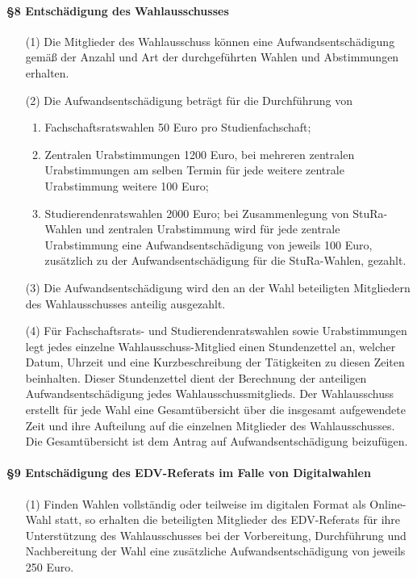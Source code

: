     \paragraph{§8 Entschädigung des Wahlausschusses}
        \begin{itemize}
            \item[(1)]  Die Mitglieder des Wahlausschuss können eine Aufwandsentschädigung gemäß der Anzahl und Art der durchgeführten Wahlen und Abstimmungen erhalten.
            \item[(2)] Die Aufwandsentschädigung beträgt für die Durchführung von
                \begin{enumerate}
                    \item   Fachschaftsratswahlen 50 Euro pro Studienfachschaft; 
                    \item   Zentralen Urabstimmungen 1200 Euro, bei mehreren zentralen Urabstimmungen am selben Termin für jede weitere zentrale Urabstimmung weitere 100 Euro; 
                    \item   Studierendenratswahlen 2000 Euro; bei Zusammenlegung von StuRa-Wahlen und zentralen Urabstimmung wird für jede zentrale Urabstimmung eine Aufwandsentschädigung von jeweils 100 Euro, zusätzlich zu der Aufwandsentschädigung für die StuRa-Wahlen, gezahlt.
                \end{enumerate}
            \item[(3)] Die Aufwandsentschädigung wird den an der Wahl beteiligten Mitgliedern des Wahlausschusses anteilig ausgezahlt. 
            \item[(4)] Für Fachschaftsrats- und Studierendenratswahlen sowie Urabstimmungen legt jedes einzelne Wahlausschuss-Mitglied einen Stundenzettel an, welcher Datum, Uhrzeit und eine Kurzbeschreibung der Tätigkeiten zu diesen Zeiten beinhalten. Dieser Stundenzettel dient der Berechnung der anteiligen Aufwandsentschädigung jedes Wahlausschussmitglieds. Der Wahlausschuss erstellt für jede Wahl eine Gesamtübersicht über die insgesamt aufgewendete Zeit und ihre Aufteilung auf  die einzelnen Mitglieder des Wahlausschusses. Die Gesamtübersicht ist dem Antrag auf Aufwandsentschädigung beizufügen.
        \end{itemize}
    \paragraph{§9 Entschädigung des EDV-Referats im Falle von Digitalwahlen}
        \begin{itemize}
            \item[(1)] Finden Wahlen vollständig oder teilweise im digitalen Format als Online-Wahl statt, so erhalten die beteiligten Mitglieder des EDV-Referats für ihre Unterstützung des Wahlausschusses bei der Vorbereitung, Durchführung und Nachbereitung der Wahl eine zusätzliche Aufwandsentschädigung von jeweils 250 Euro.
        \end{itemize}
